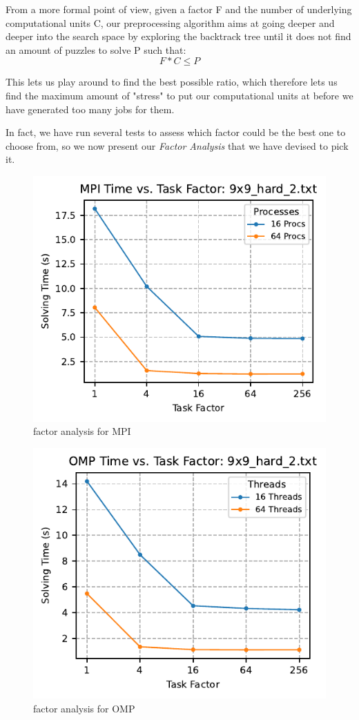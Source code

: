 From a more formal point of view, given a factor F and the number of underlying computational units C, our preprocessing algorithm aims at going deeper and deeper into the search space by exploring the backtrack tree until it does not find an amount of puzzles to solve P such that:
\[
    F * C \leq P
\]

This lets us play around to find the best possible ratio, which therefore lets us find the maximum amount of "stress" to put our computational units at before we have generated too many jobs for them.

In fact, we have run several tests to assess which factor could be the best one to choose from, so we now present our \textit{Factor Analysis} that we have devised to pick it.


\begin{figure}[htbp]
\centering
\includegraphics[width=0.9\linewidth]{imgs/factor_mpi_9x9_hard_2.pdf}
\caption{factor analysis for MPI}
\label{fig:factor_analysis_mpi}
\end{figure}

\begin{figure}[htbp]
\centering
\includegraphics[width=0.9\linewidth]{imgs/factor_omp_9x9_hard_2.pdf}
\caption{factor analysis for OMP}
\label{fig:factor_analysis_omp}
\end{figure}

